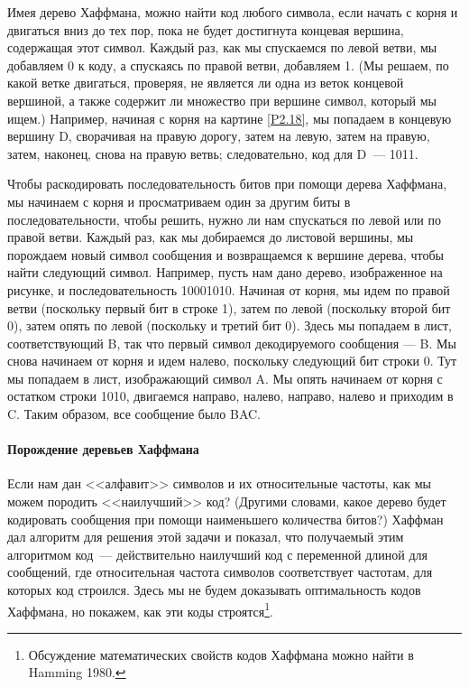 Имея дерево Хаффмана, можно найти код любого символа, если
начать с корня и двигаться вниз до тех пор, пока не будет достигнута
концевая вершина, содержащая этот символ.  Каждый раз, как мы
спускаемся по левой ветви, мы добавляем 0 к коду, а спускаясь по правой 
ветви, добавляем 1.  (Мы решаем, по какой ветке двигаться, проверяя, не  
является ли одна из веток концевой вершиной, а также
содержит ли множество при вершине символ, который мы ищем.)
Например, начиная с корня на картине \ref{P2.18}, мы
попадаем в концевую вершину D, сворачивая на правую дорогу, затем на
левую, затем на правую, затем, наконец, снова на правую ветвь; следовательно, 
код для D~--- 1011.

Чтобы раскодировать последовательность битов при помощи
дерева Хаффмана, мы начинаем с корня и просматриваем один за другим 
биты в последовательности, чтобы решить, нужно ли нам спускаться по левой
или по правой ветви.  Каждый раз, как мы добираемся до листовой
вершины, мы порождаем новый символ сообщения и возвращаемся к
вершине дерева, чтобы найти следующий символ.  Например, пусть нам
дано дерево, изображенное на рисунке, и последовательность 10001010.
Начиная от корня, мы идем по правой ветви (поскольку первый бит в
строке 1), затем по левой (поскольку второй бит 0), затем опять по
левой (поскольку и третий бит 0).  Здесь мы попадаем в лист,
соответствующий B, так что первый символ декодируемого сообщения ---
B.  Мы снова начинаем от корня и идем налево, поскольку следующий бит
строки 0.  Тут мы попадаем в лист, изображающий символ A.  Мы опять
начинаем от корня с остатком строки 1010, двигаемся направо,
налево, направо, налево и приходим в C.  Таким образом, все сообщение
было BAC.

\paragraph{Порождение деревьев Хаффмана}


Если нам дан <<алфавит>> символов и их относительные
частоты, как мы можем породить <<наилучший>> код?  (Другими словами,
какое дерево будет кодировать сообщения при помощи наименьшего
количества битов?)  Хаффман дал алгоритм для решения этой задачи и
показал, что получаемый этим алгоритмом код~--- действительно наилучший 
код с переменной длиной для сообщений, где относительная частота символов
соответствует частотам, для которых код строился.  Здесь мы не
будем доказывать 
оптимальность кодов Хаффмана, но покажем, как эти коды строятся\footnote{Обсуждение математических свойств кодов Хаффмана
можно найти в Hamming 1980.}.

